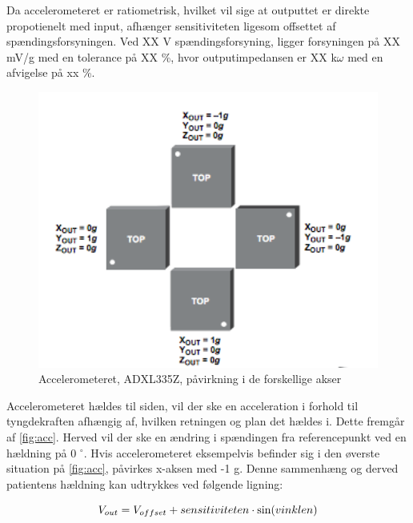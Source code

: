 Da accelerometeret er ratiometrisk, hvilket vil sige at outputtet er direkte propotienelt med input, afhænger sensitiviteten ligesom offsettet af spændingsforsyningen. Ved XX V spændingsforsyning, ligger forsyningen på XX mV/g med en tolerance på XX \%, hvor outputimpedansen er XX k$\omega$ med en afvigelse på xx \%. 

\begin{figure}[H]
\centering
\includegraphics[width=1\textwidth]{figures/acc.png}
\caption{Accelerometeret, ADXL335Z, påvirkning i de forskellige akser}
\label{fig:acc}
\end{figure}

\noindent
Accelerometeret hældes til siden, vil der ske en acceleration i forhold til tyngdekraften afhængig af, hvilken retningen og plan det hældes i. Dette fremgår af \autoref{fig:acc}. Herved vil der ske en ændring i spændingen fra referencepunkt ved en hældning på 0 $^{\circ}$. Hvis accelerometeret eksempelvis befinder sig i den øverste situation på \autoref{fig:acc}, påvirkes x-aksen med -1 g. Denne sammenhæng og derved patientens hældning kan udtrykkes ved følgende ligning:

\begin{equation}
	V_{out} = V_{offset} + sensitiviteten \cdot \sin(vinklen) \\
\end{equation}


